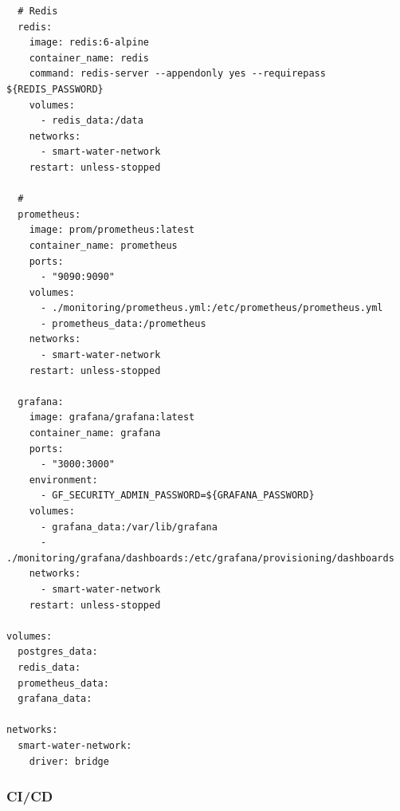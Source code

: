 \begin{lstlisting}
  # Redis
  redis:
    image: redis:6-alpine
    container_name: redis
    command: redis-server --appendonly yes --requirepass ${REDIS_PASSWORD}
    volumes:
      - redis_data:/data
    networks:
      - smart-water-network
    restart: unless-stopped
    
  # 
  prometheus:
    image: prom/prometheus:latest
    container_name: prometheus
    ports:
      - "9090:9090"
    volumes:
      - ./monitoring/prometheus.yml:/etc/prometheus/prometheus.yml
      - prometheus_data:/prometheus
    networks:
      - smart-water-network
    restart: unless-stopped
    
  grafana:
    image: grafana/grafana:latest
    container_name: grafana
    ports:
      - "3000:3000"
    environment:
      - GF_SECURITY_ADMIN_PASSWORD=${GRAFANA_PASSWORD}
    volumes:
      - grafana_data:/var/lib/grafana
      - ./monitoring/grafana/dashboards:/etc/grafana/provisioning/dashboards
    networks:
      - smart-water-network
    restart: unless-stopped

volumes:
  postgres_data:
  redis_data:
  prometheus_data:
  grafana_data:

networks:
  smart-water-network:
    driver: bridge
\end{lstlisting}

\hypertarget{cicd}{%
\subsubsection{CI/CD}\label{cicd}}

